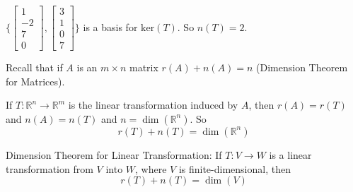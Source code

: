 \documentclass[12pt]{article}
\begin{document}
\begin{example}
$\{\begin{bmatrix} 1 \\ -2 \\ 7 \\ 0 \end{bmatrix}, \begin{bmatrix} 3 \\ 1 \\ 0 \\ 7 \end{bmatrix}\}$ is a basis for $\mathrm{ker}(T)$. So $n(T) = 2$. \end{example} 
 Recall that if $A$ is an $m \times n$ matrix $r(A) + n(A) = n$ (Dimension Theorem for Matrices). 
 \begin{theorem} If $T: \mathbb{R}^n \to \mathbb{R}^m$ is the linear transformation induced by $A$, then $r(A) = r(T)$ and $n(A) = n(T)$ and $n = \dim(\mathbb{R}^n)$. So $$r(T) + n(T) = \dim(\mathbb{R}^n) $$ \end{theorem} 
 \begin{theorem} Dimension Theorem for Linear Transformation: If $T: V \to W$ is a linear transformation from $V$ into $W$, where $V$ is finite-dimensional, then $$r(T) + n(T) = \dim(V)$$ \end{theorem} 
 
\end{document}
